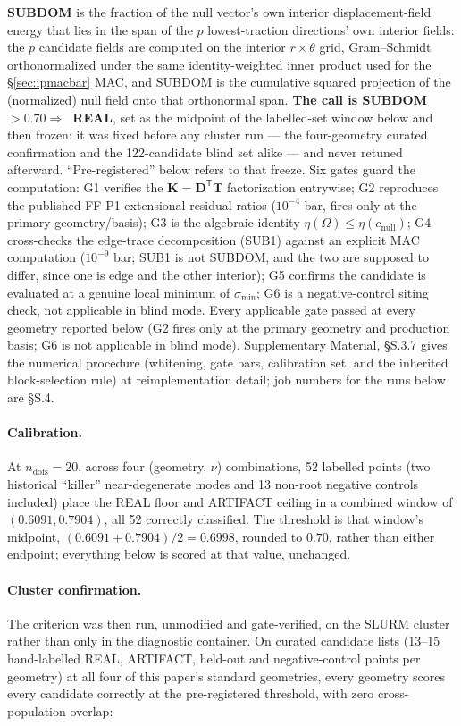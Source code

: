 \documentclass[11pt]{article}
\begin{document}
\textbf{SUBDOM} is the fraction of the null vector's own interior
displacement-field energy that lies in the span of the $p$ lowest-traction
directions' own interior fields: the $p$ candidate fields are computed on
the interior $r\times\theta$ grid, Gram--Schmidt orthonormalized under the
same identity-weighted inner product used for the \S\ref{sec:ipmacbar}
MAC, and SUBDOM is the cumulative squared projection of the (normalized)
null field onto that orthonormal span. \textbf{The call is SUBDOM~$>0.70\Rightarrow$~REAL}, set as the midpoint of
the labelled-set window below and then frozen: it was fixed before any
cluster run --- the four-geometry curated confirmation and the
122-candidate blind set alike --- and never retuned afterward.
``Pre-registered'' below refers to that freeze. Six gates guard the computation: G1 verifies the
$\mathbf{K}=\mathbf{D}^{\mathsf T}\mathbf{T}$ factorization entrywise; G2 reproduces the published FF-P1
extensional residual ratios ($10^{-4}$ bar, fires only at the primary
geometry/basis); G3 is the algebraic identity $\eta(\Omega)\le\eta(c_{\mathrm{null}})$; G4
cross-checks the edge-trace decomposition (SUB1) against an explicit MAC
computation ($10^{-9}$ bar; SUB1 is not SUBDOM, and the two are supposed
to differ, since one is edge and the other interior); G5 confirms the
candidate is evaluated at a genuine local minimum of $\sigma_{\min}$;
G6 is a negative-control siting check, not applicable in blind
mode. Every applicable gate passed at every geometry reported below
(G2 fires only at the primary geometry and production basis; G6 is not
applicable in blind mode).
Supplementary Material, §S.3.7 gives the numerical procedure (whitening,
gate bars, calibration set, and the inherited block-selection rule) at
reimplementation detail; job numbers for the runs below are §S.4.

\paragraph{Calibration.} At $n_{\mathrm{dofs}}=20$, across four
(geometry, $\nu$) combinations, 52 labelled points (two historical
``killer'' near-degenerate modes and 13 non-root negative controls
included) place the REAL floor and ARTIFACT ceiling in a combined window
of $(0.6091,0.7904)$, all 52 correctly classified. The threshold is that
window's midpoint, $(0.6091+0.7904)/2=0.6998$, rounded to $0.70$, rather
than either endpoint;
everything below is scored at that value, unchanged.

\paragraph{Cluster confirmation.} The criterion was then run, unmodified
and gate-verified, on the SLURM cluster rather than only in the diagnostic
container. On curated candidate lists (13--15 hand-labelled REAL,
ARTIFACT, held-out and negative-control points per geometry) at all four
of this paper's standard geometries, every geometry scores every
candidate correctly at the pre-registered threshold, with zero
cross-population overlap:
\end{document}
